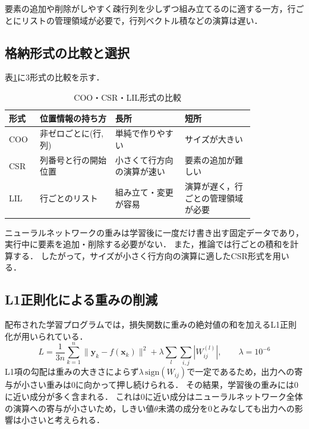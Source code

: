 \documentclass[a4paper,11pt,uplatex,dvipdfmx]{jsarticle}
\begin{document}
要素の追加や削除がしやすく疎行列を少しずつ組み立てるのに適する一方，行ごとにリストの管理領域が必要で，行列ベクトル積などの演算は遅い．

\subsection{格納形式の比較と選択}
表\ref{tab:compare}に3形式の比較を示す．

\begin{table}[H]
  \centering
  \caption{COO・CSR・LIL形式の比較}
  \label{tab:compare}
  \small
  \begin{tabular}{p{0.08\linewidth}p{0.26\linewidth}p{0.24\linewidth}p{0.24\linewidth}}
    \toprule
    形式 & 位置情報の持ち方 & 長所 & 短所 \\
    \midrule
    COO & 非ゼロごとに(行, 列) & 単純で作りやすい & サイズが大きい \\
    CSR & 列番号と行の開始位置 & 小さくて行方向の演算が速い & 要素の追加が難しい \\
    LIL & 行ごとのリスト & 組み立て・変更が容易 & 演算が遅く，行ごとの管理領域が必要 \\
    \bottomrule
  \end{tabular}
\end{table}

ニューラルネットワークの重みは学習後に一度だけ書き出す固定データであり，実行中に要素を追加・削除する必要がない．
また，推論では行ごとの積和を計算する．
したがって，サイズが小さく行方向の演算に適したCSR形式を用いる．

\subsection{L1正則化による重みの削減}
配布された学習プログラムでは，損失関数に重みの絶対値の和を加えるL1正則化が用いられている．
\begin{equation}
  L = \frac{1}{3n}\sum_{k=1}^{n} \| \boldsymbol{y}_k - f(\boldsymbol{x}_k) \|^2 + \lambda \sum_{l} \sum_{i,j} |W^{(l)}_{ij}|, \qquad \lambda = 10^{-6}
\end{equation}
L1項の勾配は重みの大きさによらず$\lambda\,\mathrm{sign}(W_{ij})$で一定であるため，出力への寄与が小さい重みは0に向かって押し続けられる．
その結果，学習後の重みには0に近い成分が多く含まれる\cite{han2016deep}．
これは0に近い成分はニューラルネットワーク全体の演算への寄与が小さいため，しきい値$\theta$未満の成分を0とみなしても出力への影響は小さいと考えられる．
\end{document}
